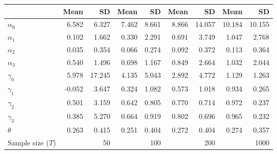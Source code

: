 
\begin{tabular}[t]{lrrrrrrrr}
\toprule
  & Mean & SD & Mean  & SD  & Mean   & SD   & Mean    & SD   \\
\midrule
$\alpha_{0}$ & 6.582 & 6.327 & 7.462 & 8.661 & 8.866 & 14.057 & 10.184 & 10.155\\
$\alpha_{1}$ & 0.102 & 1.662 & 0.330 & 2.291 & 0.691 & 3.749 & 1.047 & 2.768\\
$\alpha_{2}$ & 0.035 & 0.354 & 0.066 & 0.274 & 0.092 & 0.372 & 0.113 & 0.364\\
$\alpha_{3}$ & 0.540 & 1.496 & 0.698 & 1.167 & 0.849 & 2.664 & 1.032 & 2.044\\
$\gamma_{0}$ & 5.978 & 17.245 & 4.135 & 5.043 & 2.892 & 4.772 & 1.129 & 1.263\\
$\gamma_{1}$ & -0.052 & 3.647 & 0.324 & 1.082 & 0.573 & 1.018 & 0.934 & 0.265\\
$\gamma_{2}$ & 0.501 & 3.159 & 0.642 & 0.805 & 0.770 & 0.714 & 0.972 & 0.237\\
$\gamma_{3}$ & 0.385 & 5.270 & 0.664 & 0.919 & 0.802 & 0.696 & 0.965 & 0.232\\
$\theta$ & 0.263 & 0.415 & 0.251 & 0.404 & 0.272 & 0.404 & 0.274 & 0.357\\
Sample size ($T$) &  & 50 &  & 100 &  & 200 &  & 1000\\
\bottomrule
\end{tabular}
